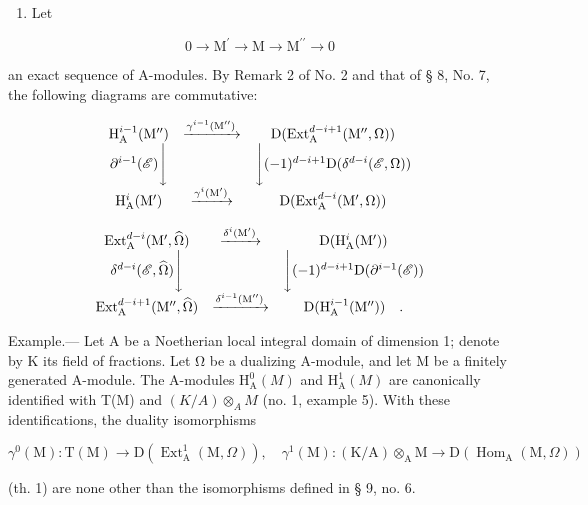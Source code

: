 \begin{enumerate}
\def\labelenumi{\arabic{enumi})}
\setcounter{enumi}{2}
\tightlist
\item
  Let
\end{enumerate}

\[
0 \rightarrow \mathrm{M} ^ {\prime} \rightarrow \mathrm{M} \rightarrow \mathrm{M} ^ {\prime \prime} \rightarrow 0\tag{ℰ}
\]

an exact sequence of A-modules. By Remark 2 of No. 2 and that of § 8, No. 7, the following diagrams are commutative:

\[
\begin{array}{c c c} \mathrm{H} _ {\mathrm{A}} ^ {i - 1} (\mathrm{M} ^ {\prime \prime}) & \xrightarrow {\gamma^ {i - 1} (\mathrm{M} ^ {\prime \prime})} & \mathrm{D} (\mathrm{Ext} _ {\mathrm{A}} ^ {d - i + 1} (\mathrm{M} ^ {\prime \prime}, \Omega)) \\ \partial^ {i - 1} (\mathscr {E}) \Bigg \downarrow & & \Bigg \downarrow (- 1) ^ {d - i + 1} \mathrm{D} (\delta^ {d - i} (\mathscr {E}, \Omega)) \\ \mathrm{H} _ {\mathrm{A}} ^ {i} (\mathrm{M} ^ {\prime}) & \xrightarrow {\gamma^ {i} (\mathrm{M} ^ {\prime})} & \mathrm{D} (\mathrm{Ext} _ {\mathrm{A}} ^ {d - i} (\mathrm{M} ^ {\prime}, \Omega)) \end{array}
\]

\[
\begin{array}{c c c} \operatorname{Ext} _ {\mathrm{A}} ^ {d - i} (\mathrm{M} ^ {\prime}, \widehat {\Omega}) & \xrightarrow {\delta^ {i} (\mathrm{M} ^ {\prime})} & \mathrm{D} (\mathrm{H} _ {\mathrm{A}} ^ {i} (\mathrm{M} ^ {\prime})) \\ \delta^ {d - i} (\mathscr {E}, \widehat {\Omega}) \Bigg \downarrow & & \Bigg \downarrow (- 1) ^ {d - i + 1} \mathrm{D} (\partial^ {i - 1} (\mathscr {E})) \\ \operatorname{Ext} _ {\mathrm{A}} ^ {d - i + 1} (\mathrm{M} ^ {\prime \prime}, \widehat {\Omega}) & \xrightarrow {\delta^ {i - 1} (\mathrm{M} ^ {\prime \prime})} & \mathrm{D} (\mathrm{H} _ {\mathrm{A}} ^ {i - 1} (\mathrm{M} ^ {\prime \prime})) \quad . \end{array}
\]

Example.--- Let A be a Noetherian local integral domain of dimension 1; denote by K its field of fractions. Let Ω be a dualizing A-module, and let M be a finitely generated A-module. The A-modules \(\mathrm{H}_{\mathrm{A}}^{0}(M)\) and \(\mathrm{H}_{\mathrm{A}}^{1}(M)\) are canonically identified with T(M) and \((K/A) \otimes_{A} M\) (no. 1, example 5). With these identifications, the duality isomorphisms

\[
\gamma^ {0} (\mathrm{M}): \mathrm{T} (\mathrm{M}) \longrightarrow \mathrm{D} \left(\operatorname{Ext} _ {\mathrm{A}} ^ {1} (\mathrm{M}, \Omega)\right), \quad \gamma^ {1} (\mathrm{M}): (\mathrm{K} / \mathrm{A}) \otimes_ {\mathrm{A}} \mathrm{M} \longrightarrow \mathrm{D} \left(\operatorname{Hom} _ {\mathrm{A}} (\mathrm{M}, \Omega)\right)
\]

(th. 1) are none other than the isomorphisms defined in § 9, no. 6.

